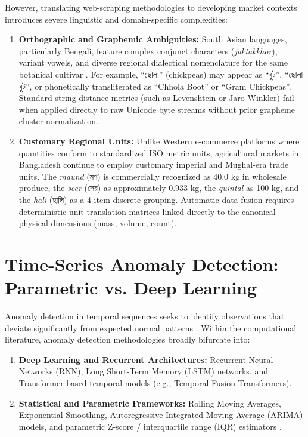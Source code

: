 However, translating web-scraping methodologies to developing market contexts introduces severe linguistic and domain-specific complexities:
\begin{enumerate}
    \item \textbf{Orthographic and Graphemic Ambiguities:} South Asian languages, particularly Bengali, feature complex conjunct characters (\textit{juktakkhor}), variant vowels, and diverse regional dialectical nomenclature for the same botanical cultivar \cite{ahmed2022bengali}. For example, ``ছোলা'' (chickpeas) may appear as ``বুট'', ``ছোলা বুট'', or phonetically transliterated as ``Chhola Boot'' or ``Gram Chickpeas''. Standard string distance metrics (such as Levenshtein or Jaro-Winkler) fail when applied directly to raw Unicode byte streams without prior grapheme cluster normalization.
    \item \textbf{Customary Regional Units:} Unlike Western e-commerce platforms where quantities conform to standardized ISO metric units, agricultural markets in Bangladesh continue to employ customary imperial and Mughal-era trade units. The \textit{maund} (মণ) is commercially recognized as 40.0 kg in wholesale produce, the \textit{seer} (সের) as approximately 0.933 kg, the \textit{quintal} as 100 kg, and the \textit{hali} (হালি) as a 4-item discrete grouping. Automatic data fusion requires deterministic unit translation matrices linked directly to the canonical physical dimensions (mass, volume, count).
\end{enumerate}

\section{Time-Series Anomaly Detection: Parametric vs. Deep Learning}
Anomaly detection in temporal sequences seeks to identify observations that deviate significantly from expected normal patterns \cite{chandola2009anomaly}. Within the computational literature, anomaly detection methodologies broadly bifurcate into:
\begin{enumerate}
    \item \textbf{Deep Learning and Recurrent Architectures:} Recurrent Neural Networks (RNN), Long Short-Term Memory (LSTM) networks, and Transformer-based temporal models (e.g., Temporal Fusion Transformers).
    \item \textbf{Statistical and Parametric Frameworks:} Rolling Moving Averages, Exponential Smoothing, Autoregressive Integrated Moving Average (ARIMA) models, and parametric Z-score / interquartile range (IQR) estimators \cite{box2015time}.
\end{enumerate}

